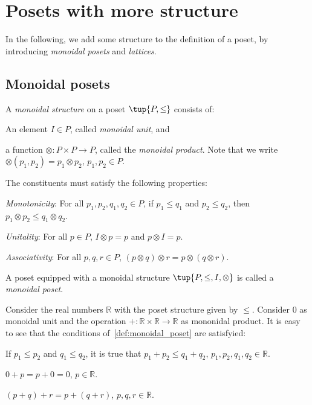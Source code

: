 \section{Posets with more structure}
In the following, we add some structure to the definition of a poset, by introducing \emph{monoidal posets} and \emph{lattices}.
\subsection{Monoidal posets}
\begin{definition}
\label{def:monoidal_poset}
A \emph{monoidal structure} on a poset $\tup{P,\leq}$ consists of:
\begin{compactenum}
    \item An element $I\in P$, called \emph{monoidal unit}, and
    \item a function $\otimes\colon P\times P\to P$, called the \emph{monoidal product}. Note that we write $\otimes(p_1,p_2)=p_1\otimes p_2$, $p_1,p_2\in P$.
\end{compactenum}
The constituents must satisfy the following properties:
\begin{compactenum}[(a)]
    \item \emph{Monotonicity}: For all $p_1,p_2,q_1,q_2\in P$, if $p_1\leq q_1$ and $p_2\leq q_2$, then $p_1\otimes p_2\leq q_1\otimes q_2$.
    \item \emph{Unitality}: For all $p\in P$, $I\otimes p=p$ and $p\otimes I=p$.
    \item \emph{Associativity}: For all $p,q,r\in P$, $(p\otimes q)\otimes r=p\otimes (q\otimes r)$.
\end{compactenum}
A poset equipped with a monoidal structure $\tup{P,\leq,I,\otimes}$ is called a \emph{monoidal poset}.
\end{definition}

\begin{example}
Consider the real numbers $\mathbb{R}$ with the poset structure given by $\leq$. Consider 0 as monoidal unit and the operation $+\colon \mathbb{R}\times \mathbb{R}\to \mathbb{R}$ as mononidal product. It is easy to see that the conditions of~\cref{def:monoidal_poset} are satisfyied:
\begin{compactenum}[(a)]
    \item If $p_1\leq p_2$ and $q_1\leq q_2$, it is true that $p_1+p_2\leq q_1+q_2$, $p_1,p_2,q_1,q_2\in \mathbb{R}$.
    \item $0+p=p+0=0$, $p\in \mathbb{R}$.
    \item $(p+q)+r=p+(q+r)$, $p,q,r\in \mathbb{R}$.
\end{compactenum}
\end{example}
